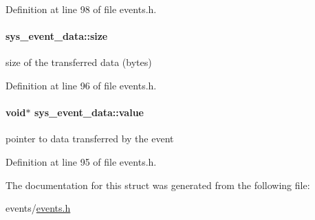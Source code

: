 Definition at line 98 of file events.\+h.

\hypertarget{structsys__event__data_a73d372cbbe27f6c6343b9c31326be6a1}{}
\paragraph[{size}]{ sys\+\_\+event\+\_\+data\+::size}\label{structsys__event__data_a73d372cbbe27f6c6343b9c31326be6a1}
size of the transferred data (bytes) 

Definition at line 96 of file events.\+h.

\hypertarget{structsys__event__data_a31efcfa64109da1bf1cebf0d9ca48ebc}{}
\paragraph[{value}]{\setlength{\rightskip}{0pt plus 5cm}void$\ast$ sys\+\_\+event\+\_\+data\+::value}\label{structsys__event__data_a31efcfa64109da1bf1cebf0d9ca48ebc}
pointer to data transferred by the event 

Definition at line 95 of file events.\+h.



The documentation for this struct was generated from the following file\+:\begin{DoxyCompactItemize}
\item 
events/\hyperlink{events_8h}{events.\+h}\end{DoxyCompactItemize}
